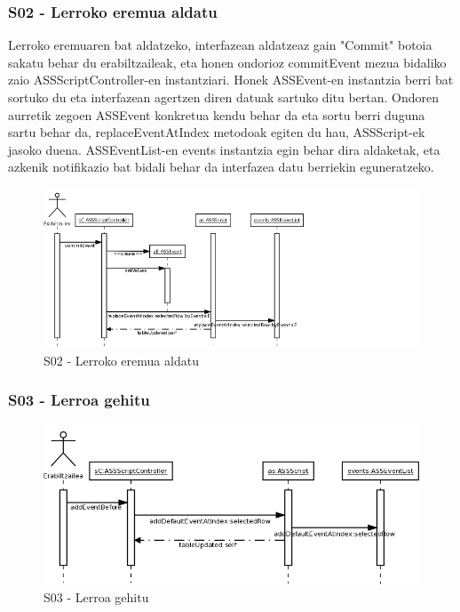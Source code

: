 \subsubsection{S02 - Lerroko eremua aldatu}
Lerroko eremuaren bat aldatzeko, interfazean aldatzeaz gain "Commit" botoia sakatu behar du erabiltzaileak, eta honen ondorioz commitEvent mezua bidaliko zaio ASSScriptController-en instantziari. Honek ASSEvent-en instantzia berri bat sortuko du eta interfazean agertzen diren datuak sartuko ditu bertan. Ondoren aurretik zegoen ASSEvent konkretua kendu behar da eta sortu berri duguna sartu behar da, replaceEventAtIndex metodoak egiten du hau, ASSScript-ek jasoko duena. ASSEventList-en events instantzia egin behar dira aldaketak, eta azkenik notifikazio bat bidali behar da interfazea datu berriekin eguneratzeko.
\begin{figure}[htp]
\begin{center}
\includegraphics[scale=0.6]{Pictures/Chapter4/Diseinua/S02.png}
\caption{S02 - Lerroko eremua aldatu}
\label{s02d}
\end{center}
\end{figure}

\subsubsection{S03 - Lerroa gehitu}
\begin{figure}[htp]
\begin{center}
\includegraphics[scale=0.35]{Pictures/Chapter4/Diseinua/S03.png}
\caption{S03 - Lerroa gehitu}
\label{s03d}
\end{center}
\end{figure}


